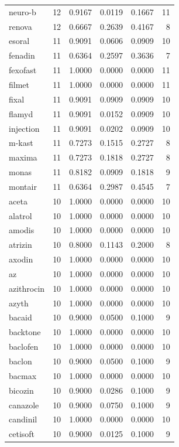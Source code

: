 \begin{longtable}{p{3.0cm}rrrrr}
neuro-b & 12 & 0.9167 & 0.0119 & 0.1667 & 11 \\
renova & 12 & 0.6667 & 0.2639 & 0.4167 & 8 \\
esoral & 11 & 0.9091 & 0.0606 & 0.0909 & 10 \\
fenadin & 11 & 0.6364 & 0.2597 & 0.3636 & 7 \\
fexofast & 11 & 1.0000 & 0.0000 & 0.0000 & 11 \\
filmet & 11 & 1.0000 & 0.0000 & 0.0000 & 11 \\
fixal & 11 & 0.9091 & 0.0909 & 0.0909 & 10 \\
flamyd & 11 & 0.9091 & 0.0152 & 0.0909 & 10 \\
injection & 11 & 0.9091 & 0.0202 & 0.0909 & 10 \\
m-kast & 11 & 0.7273 & 0.1515 & 0.2727 & 8 \\
maxima & 11 & 0.7273 & 0.1818 & 0.2727 & 8 \\
monas & 11 & 0.8182 & 0.0909 & 0.1818 & 9 \\
montair & 11 & 0.6364 & 0.2987 & 0.4545 & 7 \\
aceta & 10 & 1.0000 & 0.0000 & 0.0000 & 10 \\
alatrol & 10 & 1.0000 & 0.0000 & 0.0000 & 10 \\
amodis & 10 & 1.0000 & 0.0000 & 0.0000 & 10 \\
atrizin & 10 & 0.8000 & 0.1143 & 0.2000 & 8 \\
axodin & 10 & 1.0000 & 0.0000 & 0.0000 & 10 \\
az & 10 & 1.0000 & 0.0000 & 0.0000 & 10 \\
azithrocin & 10 & 1.0000 & 0.0000 & 0.0000 & 10 \\
azyth & 10 & 1.0000 & 0.0000 & 0.0000 & 10 \\
bacaid & 10 & 0.9000 & 0.0500 & 0.1000 & 9 \\
backtone & 10 & 1.0000 & 0.0000 & 0.0000 & 10 \\
baclofen & 10 & 1.0000 & 0.0000 & 0.0000 & 10 \\
baclon & 10 & 0.9000 & 0.0500 & 0.1000 & 9 \\
bacmax & 10 & 1.0000 & 0.0000 & 0.0000 & 10 \\
bicozin & 10 & 0.9000 & 0.0286 & 0.1000 & 9 \\
canazole & 10 & 0.9000 & 0.0750 & 0.1000 & 9 \\
candinil & 10 & 1.0000 & 0.0000 & 0.0000 & 10 \\
cetisoft & 10 & 0.9000 & 0.0125 & 0.1000 & 9 \\

\end{longtable}
